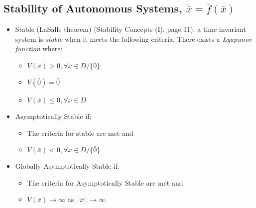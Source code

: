 \documentclass[12pt]{article}
\begin{document}
\subsection*{Stability of Autonomous Systems, $\dot{\bar{x}}=\bar{f}(\bar{x})$}
\begin{itemize}
\item Stable (LaSalle theorem) (Stability Concepts (I), page 11): a time invariant system is {\em stable} when it meets the following criteria. There exists a {\em Lyapunov function} where:
	\begin{itemize}
	\item $V(\bar{x})>0, \forall x \in D/\{\bar{0}\}$
	\item $V(\bar{0})=\bar{0}$
	\item $V(\bar{x})\leq0, \forall x \in D$
	\end{itemize}
\item Asymptotically Stable if:
	\begin{itemize}
	\item The criteria for stable are met and
	\item $V(\bar{x})<0, \forall x \in D/\{\bar{0}\}$
	\end{itemize}
\item Globally Asymptotically Stable if:
	\begin{itemize}
	\item The criteria for Asymptotically Stable are met and
	\item $V(\bar{x})\to\infty$ as $||\bar{x}||\to\infty$
	\end{itemize}
\end{itemize}

\newpage
\end{document}
